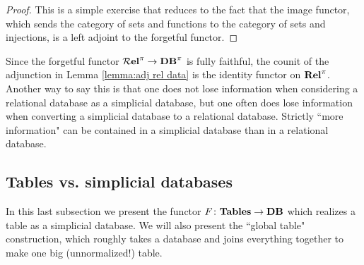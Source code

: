 \documentclass{amsart}
\begin{document}
\begin{proof}

This is a simple exercise that reduces to the fact that the image functor, which sends the category of sets and functions to the category of sets and injections, is a left adjoint to the forgetful functor.

\end{proof}

Since the forgetful functor ${\bf \mathcal{R} el}^\pi\rightarrow{\bf DB}^\pi$ is fully faithful, the counit of the adjunction in Lemma \ref{lemma:adj rel data} is the identity functor on ${\bf Rel}^\pi$.  Another way to say this is that one does not lose information when considering a relational database as a simplicial database, but one often does lose information when converting a simplicial database to a relational database.  Strictly ``more information" can be contained in a simplicial database than in a relational database.

\subsection{Tables vs. simplicial databases}

In this last subsection we present the functor $F\colon{\bf Tables}\rightarrow{\bf DB}$ which realizes a table as a simplicial database.  We will also present the ``global table" construction, which roughly takes a database and joins everything together to make one big (unnormalized!) table.
\end{document}
